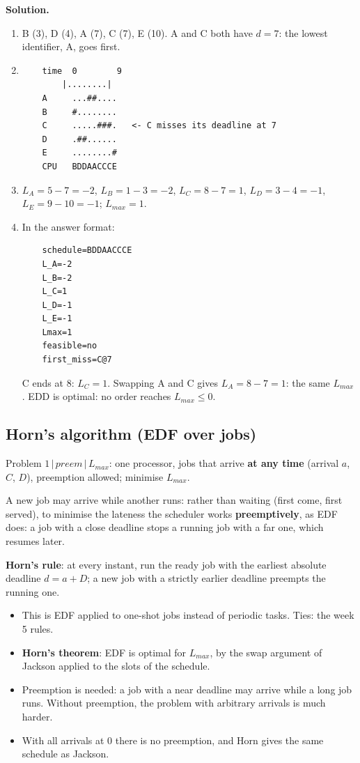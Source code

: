 \textbf{Solution.}
\begin{enumerate}
    \item B (3), D (4), A (7), C (7), E (10). A and C both have $d = 7$: the lowest identifier, A, goes first.
    \item \begin{verbatim}
    time  0        9
        |........|
    A     ...##....
    B     #........
    C     .....###.   <- C misses its deadline at 7
    D     .##......
    E     ........#
    CPU   BDDAACCCE
\end{verbatim}
    \item $L_A = 5 - 7 = -2$, $L_B = 1 - 3 = -2$, $L_C = 8 - 7 = 1$, $L_D = 3 - 4 = -1$, $L_E = 9 - 10 = -1$; $L_{max} = 1$.
    \item In the answer format:
\begin{verbatim}
    schedule=BDDAACCCE
    L_A=-2
    L_B=-2
    L_C=1
    L_D=-1
    L_E=-1
    Lmax=1
    feasible=no
    first_miss=C@7
\end{verbatim}
    C ends at 8: $L_C = 1$. Swapping A and C gives $L_A = 8 - 7 = 1$: the same $L_{max}$. EDD is optimal: no order reaches $L_{max} \le 0$.
\end{enumerate}

\subsection{Horn's algorithm (EDF over jobs)}
Problem $1 \,|\, \textit{preem} \,|\, L_{max}$: one processor, jobs that arrive \textbf{at any time} (arrival $a$, $C$, $D$), preemption allowed; minimise $L_{max}$.

A new job may arrive while another runs: rather than waiting (first come, first served), to minimise the lateness the scheduler works \textbf{preemptively}, as EDF does: a job with a close deadline stops a running job with a far one, which resumes later.

\textbf{Horn's rule}: at every instant, run the ready job with the earliest absolute deadline $d = a + D$; a new job with a strictly earlier deadline preempts the running one.
\begin{itemize}
    \item This is EDF applied to one-shot jobs instead of periodic tasks. Ties: the week 5 rules.
    \item \textbf{Horn's theorem}: EDF is optimal for $L_{max}$, by the swap argument of Jackson applied to the slots of the schedule.
    \item Preemption is needed: a job with a near deadline may arrive while a long job runs. Without preemption, the problem with arbitrary arrivals is much harder.
    \item With all arrivals at 0 there is no preemption, and Horn gives the same schedule as Jackson.
\end{itemize}

